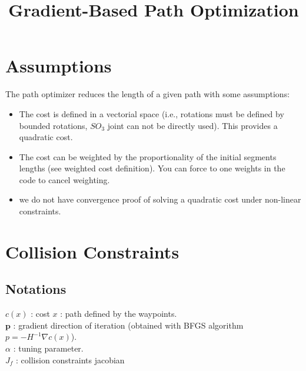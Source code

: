 \documentclass {article}
\title {Gradient-Based Path Optimization}
\begin{document}
\maketitle

\tableofcontents

\newpage

\section{Assumptions}

The path optimizer reduces the length of a given path with some assumptions:
\begin{itemize}
\item The cost is defined in a vectorial space (i.e., rotations must be defined by bounded rotations, $SO_3$ joint can not be directly used). This provides a quadratic cost.

\item The cost can be weighted by the proportionality of the initial segments lengths (see weighted cost definition). You can force to one weights in the code to cancel weighting.

\item we do not have convergence proof of solving a quadratic cost under non-linear constraints.

\end{itemize}



\newpage

\section{Collision Constraints}
\subsection{Notations}
$c(x)$ : cost
$x$ : path defined by the waypoints. \\
$\mathbf{p}$ : gradient direction of iteration (obtained with BFGS algorithm 
$p = -H^{-1}\nabla c(x)$). \\
$\alpha$ : tuning parameter. \\
$J_f$ : collision constraints jacobian
\end{document}

